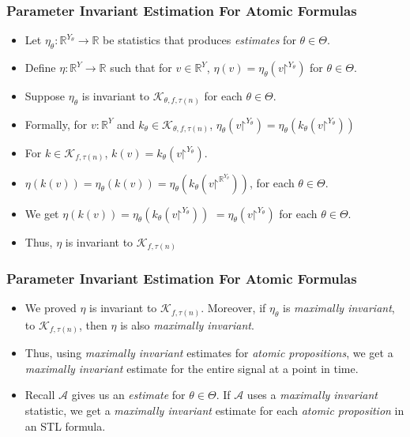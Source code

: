 \documentclass{beamer}
\renewcommand{\restriction}{\mathord{\upharpoonright}}
\newcommand{\typeReal}{\mathbb{R}}
\newcommand{\K}{\mathcal{K}}
\newcommand{\A}{\mathcal{A}}
\begin{document}
\begin{frame}
    \frametitle{Parameter Invariant Estimation For Atomic Formulas}
    \begin{itemize}
        \item Let $\eta_{\theta} : \typeReal^{Y_{\theta}} \to \typeReal$
            be statistics that produces \textit{estimates} for $\theta \in \Theta$.
        \item Define $\eta:\typeReal^{Y} \to \typeReal$ such
            that for $v \in \typeReal^{Y}$,
            $\eta(v) = \eta_{\theta}(v\restriction^{Y_{\theta}})$ for $\theta \in \Theta$.
        \item Suppose $\eta_{\theta}$ is invariant to $\K_{\theta, f, \tau(n)}$
            for each $\theta \in \Theta$.
        \pause
        \item Formally, for $v : \typeReal^{Y}$ and
         $k_{\theta} \in \K_{\theta, f, \tau(n)}$,
            $\eta_{\theta}(v\restriction^{Y_{\theta}})
            = \eta_{\theta}(k_{\theta}(v\restriction^{Y_{\theta}}))$
        \item For $k \in \K_{f, \tau(n)}$, $k(v) =
            k_{\theta}(v\restriction^{Y_{\theta}})$.
        \item $\eta(k(v)) = \eta_{\theta}(k(v)) = \eta_{\theta}(k_{\theta}(v\restriction^{\typeReal^{Y_{\theta}}}))$,
            for each $\theta \in \Theta$.
        \item We get $\eta(k(v))
            = \eta_{\theta}(k_{\theta}(v \restriction^{Y_{\theta}}))$
            $=\eta_{\theta}(v\restriction^{Y_{\theta}})$ for each $\theta \in
            \Theta$.
        \item Thus, $\eta$ is invariant to $\K_{f, \tau(n)}$
    \end{itemize}
\end{frame}

\begin{frame}
    \frametitle{Parameter Invariant Estimation For Atomic Formulas}
    \begin{itemize}
        \item We proved $\eta$ is invariant to $\K_{f, \tau(n)}$. Moreover,
            if $\eta_{\theta}$ is \textit{maximally invariant},
            to $\K_{f, \tau(n)}$, then $\eta$ is also
            \textit{maximally invariant}.
        \item Thus, using \textit{maximally invariant} estimates
            for \textit{atomic propositions}, we get
            a \textit{maximally invariant} estimate for the
            entire signal at a point in time.
        \item Recall $\A$ gives us an \textit{estimate}
            for $\theta \in \Theta$. If $\A$ uses a
            \textit{maximally invariant} statistic, we
            get a \textit{maximally invariant} estimate for
            each \textit{atomic proposition} in an STL formula.
    \end{itemize}
\end{frame}
\end{document}
